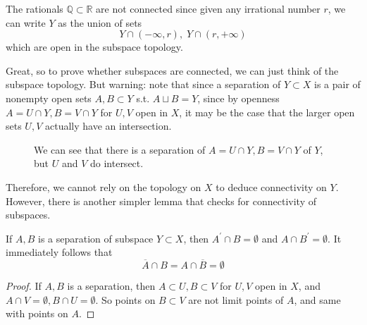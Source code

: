   \begin{example}
    The rationals $\mathbb{Q} \subset \mathbb{R}$ are not connected since given any irrational number $r$, we can write $Y$ as the union of sets
    \begin{equation}
      Y \cap (-\infty, r), \; Y \cap (r, +\infty)
    \end{equation}
    which are open in the subspace topology. 
  \end{example}

  Great, so to prove whether subspaces are connected, we can just think of the subspace topology. But warning: note that since a separation of $Y \subset X$ is a pair of nonempty open sets $A, B \subset Y$ s.t. $A \sqcup B = Y$, since by openness $A = U \cap Y, B = V \cap Y$ for $U, V$ open in $X$, it may be the case that the larger open sets $U, V$ actually have an intersection. 

  \begin{figure}[H]
    \centering 
    \caption{We can see that there is a separation of $A = U \cap Y, B = V \cap Y$ of $Y$, but $U$ and $V$ do intersect.} 
  \end{figure}

  Therefore, we cannot rely on the topology on $X$ to deduce connectivity on $Y$. However, there is another simpler lemma that checks for connectivity of subspaces. 

  \begin{lemma}
    If $A, B$ is a separation of subspace $Y \subset X$, then $A^\prime \cap B = \emptyset$ and $A \cap B^\prime = \emptyset$. It immediately follows that 
    \begin{equation}
      \overline{A} \cap B = A \cap \overline{B} = \emptyset
    \end{equation}
  \end{lemma}
  \begin{proof}
    If $A, B$ is a separation, then $A \subset U, B \subset V$ for $U, V$ open in $X$, and $A \cap V = \emptyset, B \cap U = \emptyset$. So points on $B \subset V$ are not limit points of $A$, and same with points on $A$. 
  \end{proof} 


